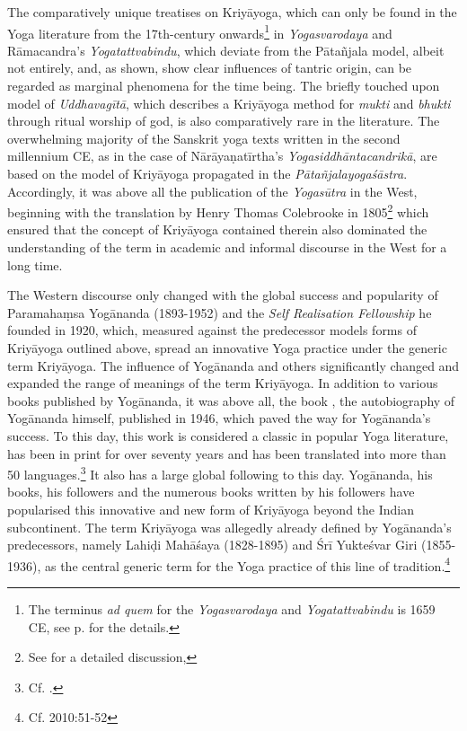 The comparatively unique treatises on Kriyāyoga, which can only be found in the Yoga literature from the 17th-century onwards\footnote{The terminus \textit{ad quem} for the \textit{Yogasvarodaya} and \textit{Yogatattvabindu} is 1659 CE, see p.\pageref{dating} for the details.} in \textit{Yogasvarodaya} and Rāmacandra's \textit{Yogatattvabindu}, which deviate from the Pātañjala model, albeit not entirely, and, as shown, show clear influences of tantric origin, can be regarded as marginal phenomena for the time being. The briefly touched upon model of \textit{Uddhavagītā}, which describes a Kriyāyoga method for \textit{mukti} and \textit{bhukti} through ritual worship of god, is also comparatively rare in the literature. The overwhelming majority of the Sanskrit yoga texts written in the second millennium CE, as in the case of Nārāyaṇatīrtha's \textit{Yogasiddhāntacandrikā}, are based on the model of Kriyāyoga propagated in the \textit{Pātañjalayogaśāstra}. Accordingly, it was above all the publication of the \textit{Yogasūtra} in the West, beginning with the translation by Henry Thomas Colebrooke in 1805\footnote{See \parencite{colebrooke2014} for a detailed discussion,} which ensured that the concept of Kriyāyoga contained therein also dominated the understanding of the term in academic and informal discourse in the West for a long time. 

The Western discourse only changed with the global success and popularity of Paramahaṃsa Yogānanda (1893-1952) and the \textit{Self Realisation Fellowship} he founded in 1920, which, measured against the predecessor models forms of Kriyāyoga outlined above, spread an innovative Yoga practice under the generic term Kriyāyoga. The influence of Yogānanda and others significantly changed and expanded the range of meanings of the term Kriyāyoga. In addition to various books published by Yogānanda, it was above all, the book , the autobiography of Yogānanda himself, published in 1946, which paved the way for Yogānanda's success. To this day, this work is considered a classic in popular Yoga literature, has been in print for over seventy years and has been translated into more than 50 languages.\footnote{Cf. \cite{yoganandawebsite}.} It also has a large global following to this day. Yogānanda, his books, his followers and the numerous books written by his followers have popularised this innovative and new form of Kriyāyoga beyond the Indian subcontinent. The term Kriyāyoga was allegedly already defined by Yogānanda's predecessors, namely Lahiḍi Mahāśaya (1828-1895) and Śrī Yukteśvar Giri (1855-1936), as the central generic term for the Yoga practice of this line of tradition.\footnote{Cf. \citeauthor{govindan2010} 2010:51-52} 

